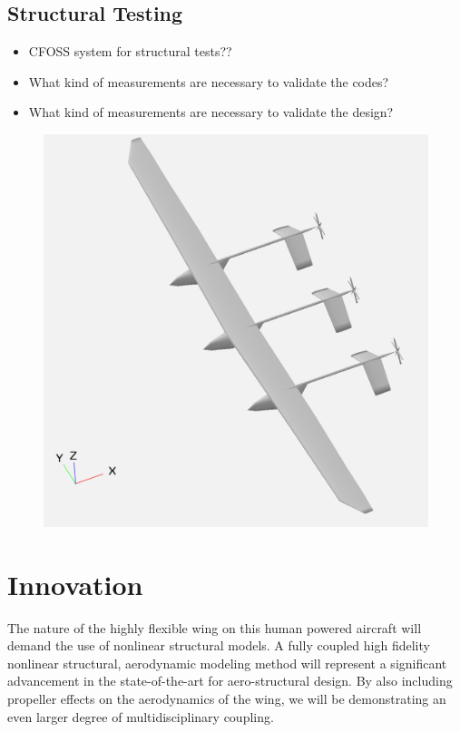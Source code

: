 \documentclass[]{aiaa-tc}
\begin{document}
    \subsection{Structural Testing}
        \begin{itemize}
            \item CFOSS system for structural tests?? 
            \item What kind of measurements are necessary to validate the codes? 
            \item What kind of measurements are necessary to validate the design? 
        \end{itemize}

    
    \begin{figure}
        \includegraphics[width=\textwidth]{images/vsp_concept_solid}
    \end{figure}

  \section{Innovation}
    The nature of the highly flexible wing on this human powered aircraft will demand the use 
    of nonlinear structural models. A fully coupled high fidelity nonlinear structural, aerodynamic modeling method 
    will represent a significant advancement in the state­-of-­the-­art for aero­-structural design. By also including 
    propeller effects on the aerodynamics of the wing, we will be demonstrating an even larger degree of multidisciplinary 
    coupling. 
\end{document}
